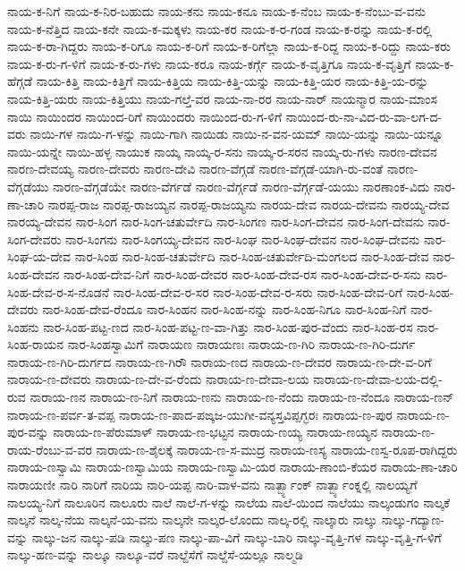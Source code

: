 ನಾಯ-ಕ-ನಿಗೆ
ನಾಯ-ಕ-ನಿರ-ಬಹುದು
ನಾಯ-ಕನು
ನಾಯ-ಕನೂ
ನಾಯ-ಕ-ನೆಂಬ
ನಾಯ-ಕ-ನೆಂಬು-ವ-ವನು
ನಾಯ-ಕ-ನೆತ್ತಿದ
ನಾಯ-ಕನೇ
ನಾಯ-ಕ-ಮಕ್ಕಳು
ನಾಯ-ಕರ
ನಾಯ-ಕ-ರ-ಗಂಡ
ನಾಯ-ಕ-ರನ್ನು
ನಾಯ-ಕ-ರಲ್ಲಿ
ನಾಯ-ಕ-ರಾ-ಗಿದ್ದರು
ನಾಯ-ಕ-ರಿಗೂ
ನಾಯ-ಕ-ರಿಗೆ
ನಾಯ-ಕ-ರಿಗೆಲ್ಲಾ
ನಾಯ-ಕ-ರಿದ್ದ
ನಾಯ-ಕ-ರಿದ್ದು
ನಾಯ-ಕರು
ನಾಯ-ಕ-ರು-ಗ-ಳಿಗೆ
ನಾಯ-ಕ-ರು-ಗಳು
ನಾಯ-ಕರೂ
ನಾಯ-ಕರ್ಗ್ಗೆ
ನಾಯ-ಕ-ವೃತ್ತಿಗೂ
ನಾಯ-ಕ-ವೃತ್ತಿಗೆ
ನಾಯ-ಕ-ಹೆಗ್ಗಡೆ
ನಾಯ-ಕಿತ್ತಿ
ನಾಯ-ಕಿತ್ತಿಗೆ
ನಾಯ-ಕಿತ್ತಿಯ
ನಾಯ-ಕಿತ್ತಿ-ಯನ್ನು
ನಾಯ-ಕಿತ್ತಿ-ಯರ
ನಾಯ-ಕಿತ್ತಿ-ಯ-ರನ್ನು
ನಾಯ-ಕಿತ್ತಿ-ಯರು
ನಾಯ-ಕಿತ್ತಿಯು
ನಾಯ-ಗಲ್ತೆ-ವರ
ನಾಯ-ನಾ-ರರ
ನಾಯ-ನಾರ್
ನಾಯನ್ಮಾರ
ನಾಯ-ಮಾಂಸ
ನಾಯಿ
ನಾಯಿಂದರ
ನಾಯಿಂದ-ರಿಗೆ
ನಾಯಿಂದರು
ನಾಯಿಂದ-ರು-ಗ-ಳಿಗೆ
ನಾಯಿಂದ-ರು-ನಾ-ವಿದ-ರು-ವಾ-ಲಗ-ದ-ವರು
ನಾಯಿ-ಗಳ
ನಾಯಿ-ಗ-ಳನ್ನು
ನಾಯಿ-ಗಾಗಿ
ನಾಯಿಡು
ನಾಯಿ-ನ-ವನ-ಯಮ್
ನಾಯಿ-ಯನ್ನು
ನಾಯಿ-ಯನ್ನೂ
ನಾಯಿ-ಯನ್ನೇ
ನಾಯಿ-ಹಳ್ಳ
ನಾಯುಕ
ನಾಯ್ಕ
ನಾಯ್ಕ-ರ-ಸನು
ನಾಯ್ಕ-ರ-ಸರನ
ನಾಯ್ಕ-ರು-ಗಳು
ನಾರಣ-ದೇವನ
ನಾರಣ-ದೇವಯ್ಯ
ನಾರಣ-ದೇವರು
ನಾರಣ-ದೇವಿ
ನಾರಣ-ವೆಗ್ಗಡೆ
ನಾರಣ-ವೆಗ್ಗಡೆ-ಯಾಗಿ-ರು-ವಂತೆ
ನಾರಣ-ವೆಗ್ಗಡೆಯು
ನಾರಣ-ವೆಗ್ಗಡೆಯೇ
ನಾರಣ-ವೆರ್ಗಡೆ
ನಾರಣ-ವೆರ್ಗ್ಗಡೆ
ನಾರಣ-ವೆರ್ಗ್ಗಡೆ-ಯಯು
ನಾರಣಾಂಕ-ವಿದು
ನಾರ-ಣಾ-ಚಾರಿ
ನಾರಪ್ಪ-ರಾಜ
ನಾರಪ್ಪ-ರಾಜಯ್ಯನ
ನಾರಪ್ಪ-ರಾಜಯ್ಯನು
ನಾರಯ-ದೇವ
ನಾರಯ-ದೇವನು
ನಾರಯ್ಯ-ದೇವ
ನಾರಯ್ಯ-ದೇವನ
ನಾರ-ಸಿಂಗ
ನಾರ-ಸಿಂಗ-ಚತುರ್ವೇದಿ
ನಾರ-ಸಿಂಗಣ
ನಾರ-ಸಿಂಗ-ದೇವನ
ನಾರ-ಸಿಂಗ-ದೇವನು
ನಾರ-ಸಿಂಗ-ದೇವರು
ನಾರ-ಸಿಂಗನು
ನಾರ-ಸಿಂಗಯ್ಯ-ದೇವನ
ನಾರ-ಸಿಂಘ
ನಾರ-ಸಿಂಘ-ದೇವನ
ನಾರ-ಸಿಂಘ-ದೇವನು
ನಾರ-ಸಿಂಘ-ಯ-ದೇವ
ನಾರ-ಸಿಂಹ
ನಾರ-ಸಿಂಹ-ಚತುರ್ವೇದಿ
ನಾರ-ಸಿಂಹ-ಚತುರ್ವೇದಿ-ಮಂಗಲದ
ನಾರ-ಸಿಂಹ-ದೇವ
ನಾರ-ಸಿಂಹ-ದೇವನ
ನಾರ-ಸಿಂಹ-ದೇವ-ನಿಗೆ
ನಾರ-ಸಿಂಹ-ದೇವರ
ನಾರ-ಸಿಂಹ-ದೇವ-ರಸ
ನಾರ-ಸಿಂಹ-ದೇವ-ರ-ಸನು
ನಾರ-ಸಿಂಹ-ದೇವ-ರ-ಸ-ನೊಡನೆ
ನಾರ-ಸಿಂಹ-ದೇವ-ರ-ಸರ
ನಾರ-ಸಿಂಹ-ದೇವ-ರ-ಸರು
ನಾರ-ಸಿಂಹ-ದೇವ-ರಿಗೆ
ನಾರ-ಸಿಂಹ-ದೇವರು
ನಾರ-ಸಿಂಹ-ದೇವ-ರೆಂದೂ
ನಾರ-ಸಿಂಹನ
ನಾರ-ಸಿಂಹ-ನನ್ನು
ನಾರ-ಸಿಂಹ-ನಿಗೂ
ನಾರ-ಸಿಂಹ-ನಿಗೆ
ನಾರ-ಸಿಂಹನು
ನಾರ-ಸಿಂಹ-ಪಟ್ಟ-ಣದ
ನಾರ-ಸಿಂಹ-ಪಟ್ಟ-ಣ-ವಾ-ಗಿತ್ತು
ನಾರ-ಸಿಂಹ-ಪುರ-ವೆಂದು
ನಾರ-ಸಿಂಹ-ರಸ
ನಾರ-ಸಿಂಹ-ರಾಯನ
ನಾರ-ಸಿಂಹಸ್ವಾಮಿಗೆ
ನಾರಾಯಣ
ನಾರಾಯಣಃ
ನಾರಾಯ-ಣ-ಗಿರಿ
ನಾರಾಯ-ಣ-ಗಿರಿ-ದುರ್ಗ
ನಾರಾಯ-ಣ-ಗಿರಿ-ದುರ್ಗದ
ನಾರಾಯ-ಣ-ಗಿರೌ
ನಾರಾಯ-ಣದ
ನಾರಾಯ-ಣ-ದೇವರ
ನಾರಾಯ-ಣ-ದೇ-ವ-ರಿಗೆ
ನಾರಾಯ-ಣ-ದೇವರು
ನಾರಾಯ-ಣ-ದೇ-ವ-ರೆಂದು
ನಾರಾಯ-ಣ-ದೇವಾ-ಲಯ
ನಾರಾಯ-ಣ-ದೇವಾ-ಲಯ-ದಲ್ಲಿ-ರುವ
ನಾರಾಯ-ಣನ
ನಾರಾಯ-ಣ-ನಿಗೆ
ನಾರಾಯ-ಣನು
ನಾರಾಯ-ಣ-ನೆಂದು
ನಾರಾಯ-ಣ-ನೆಂದೂ
ನಾರಾಯ-ಣನ್
ನಾರಾಯ-ಣ-ಪರ್ವ-ತ-ವಪ್ಪ
ನಾರಾಯ-ಣ-ಪಾದ-ಪಙ್ಕಜ-ಯುಗೀ-ವನ್ಯಸ್ತವಿಪ್ಪಗ್ಭರಃ
ನಾರಾಯ-ಣ-ಪುರ
ನಾರಾಯ-ಣ-ಪುರ-ವನ್ನು
ನಾರಾಯ-ಣ-ಪೆರುಮಾಳ್
ನಾರಾಯ-ಣ-ಭಟ್ಟನ
ನಾರಾಯ-ಣಯ್ಯ
ನಾರಾಯ-ಣಯ್ಯನ
ನಾರಾಯ-ಣ-ರಾಯ-ರೆಂಬು-ವ-ವರ
ನಾರಾಯ-ಣ-ಶೈಲಕ್ಕೆ
ನಾರಾಯ-ಣ-ಸ-ಮುದ್ರ
ನಾರಾಯ-ಣಸ್ಯ
ನಾರಾಯ-ಣಸ್ವ-ರೂಪ-ರಾಗಿದ್ದರು
ನಾರಾಯ-ಣಸ್ವಾಮಿ
ನಾರಾಯ-ಣಸ್ವಾಮಿಯ
ನಾರಾಯ-ಣಸ್ವಾಮಿ-ಯರ
ನಾರಾಯ-ಣಾಂಬಿ-ಕೆಯರ
ನಾರಾಯ-ಣಾ-ಚಾರಿ
ನಾರಾಯಣೀ
ನಾರಿ
ನಾರಿಗೆ
ನಾರಿಯ
ನಾರಿ-ಯಪ್ಪ
ನಾರಿ-ವಾಳ-ವನು
ನಾರ್ತ್ಬ್ಯಾಂಕ್
ನಾರ್ತ್ಬ್ಯಾಂಕ್ನಲ್ಲಿ
ನಾಲಯ್ಯಗೆ
ನಾಲಯ್ಯ-ನಿಗೆ
ನಾಲೂರಿನ
ನಾಲೂರು
ನಾಲೆ
ನಾಲೆ-ಗ-ಳನ್ನು
ನಾಲೆಯ
ನಾಲೆ-ಯಿಂದ
ನಾಲೆಯು
ನಾಲ್ಕಂಡುಗಂ
ನಾಲ್ಕಕೆ
ನಾಲ್ಕನೆ
ನಾಲ್ಕ-ನೆಯ
ನಾಲ್ಕನೆ-ಯ-ವನು
ನಾಲ್ಕನೇ
ನಾಲ್ಕರ-ಲೊಂದು
ನಾಲ್ಕ-ರಲ್ಲಿ
ನಾಲ್ಕಾರು
ನಾಲ್ಕು
ನಾಲ್ಕು-ಗದ್ಯಾಣ-ವನ್ನು
ನಾಲ್ಕು-ಜನ
ನಾಲ್ಕು-ಪಡಿ
ನಾಲ್ಕು-ಪಣ
ನಾಲ್ಕು-ಪಾ-ವಿಗೆ
ನಾಲ್ಕು-ಬಾರಿ
ನಾಲ್ಕು-ವೃತ್ತಿ-ಗಳ
ನಾಲ್ಕು-ವೃತ್ತಿ-ಗ-ಳಿಗೆ
ನಾಲ್ಕು-ಹಣ-ವನ್ನು
ನಾಲ್ಕೂ
ನಾಲ್ಕೂ-ವರೆ
ನಾಲ್ದೆಸೆಗೆ
ನಾಲ್ದೆಸೆ-ಯಲ್ಲೂ
ನಾಲ್ಮಡಿ
